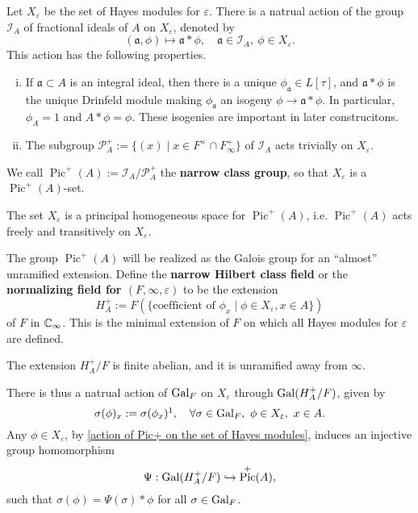 \documentclass{article}
\DeclareMathOperator{\pic}{Pic}
\begin{document}
Let $X_\varepsilon$ be the set of Hayes modules for $\varepsilon$.
There is a natrual action of the group $\mathcal{I}_A$ of fractional ideals of $A$ on $X_\varepsilon$, denoted by \[(\mathfrak{a}, \phi)\mapsto\mathfrak{a} * \phi, \quad \mathfrak{a}\in\mathcal{I}_A,\ \phi\in X_\varepsilon.\]
This action has the following properties.
\begin{enumerate}[(i)]
    \item If $\mathfrak{a}\subset A$ is an integral ideal, then there is a unique $\phi_\mathfrak{a}\in L[\tau]$, and $\mathfrak{a} * \phi$ is the unique Drinfeld module making $\phi_\mathfrak{a}$ an isogeny $\phi\to\mathfrak{a} * \phi$. 
    In particular, $\phi_A = 1$ and $A*\phi = \phi$.
    These isogenies are important in later construcitons.
    \item The subgroup $\mathcal{P}_A^+ := \{(x)\mid x\in F^\times\cap F_\infty^+\}$ of $\mathcal{I}_A$
    acts trivially on $X_\varepsilon$.
\end{enumerate}
We call $\pic^+(A) := \mathcal{I}_A/\mathcal{P}^+_A$ the \textbf{narrow class group}, so that $X_\varepsilon$ is a $\pic^+(A)$-set.
\begin{proposition}\label{action of Pic+ on the set of Hayes modules}
    The set $X_\varepsilon$ is a principal homogeneous space for $\pic^+(A)$, i.e. $\pic^+(A)$ acts freely and transitively on $X_\varepsilon$.
\end{proposition}
The group $\pic^+(A)$ will be realized as the Galois group for an ``almost'' unramified extension.
Define the \textbf{narrow Hilbert class field} or the \textbf{normalizing field for $(F, \infty, \varepsilon)$} to be the extension \[H_A^+ := F\left( \{\text{coefficient of }\phi_x\mid \phi\in X_\varepsilon, x\in A\} \right)\]
of $F$ in $\mathbb{C}_\infty$. This is the minimal extension of $F$ on which all Hayes modules for $\varepsilon$ are defined.
\begin{proposition}\label{narrow Hilbert class field is unramified outside infty}
    The extension $H_A^+/F$ is finite abelian, and it is unramified away from $\infty$.
\end{proposition}
There is thus a natrual action of $\operatorname{Gal}_F$ on $X_\varepsilon$ through $\operatorname{Gal}(H_A^+/F)$, given by \[\sigma(\phi)_x := \sigma(\phi_x)\footnotemark,\quad \forall\sigma\in\gal_F,\ \phi\in X_\varepsilon,\ x\in A.\]
Any $\phi\in X_\varepsilon$, by \cref{action of Pic+ on the set of Hayes modules}, induces an injective group homomorphism
\[\Psi : \gal(H_A^+/F)\inject \pic^+(A),\]
such that $\sigma(\phi) = \Psi(\sigma) * \phi$ for all $\sigma\in\operatorname{Gal}_F$.
\end{document}
